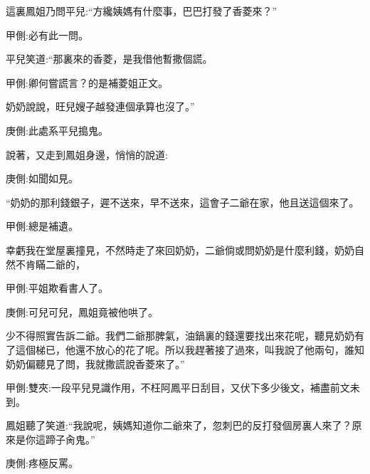 \begin{parag}
    這裏鳳姐乃問平兒:“方纔姨媽有什麼事，巴巴打發了香菱來？”\begin{note}甲側:必有此一問。\end{note}平兒笑道:“那裏來的香菱，是我借他暫撒個謊。\begin{note}甲側:卿何嘗謊言？的是補菱姐正文。\end{note}奶奶說說，旺兒嫂子越發連個承算也沒了。”\begin{note}庚側:此處系平兒搗鬼。\end{note}說著，又走到鳳姐身邊，悄悄的說道:\begin{note}庚側:如聞如見。\end{note}“奶奶的那利錢銀子，遲不送來，早不送來，這會子二爺在家，他且送這個來了。\begin{note}甲側:總是補遺。\end{note}幸虧我在堂屋裏撞見，不然時走了來回奶奶，二爺倘或問奶奶是什麼利錢，奶奶自然不肯瞞二爺的，\begin{note}甲側:平姐欺看書人了。\end{note}\begin{note}庚側:可兒可兒，鳳姐竟被他哄了。\end{note}少不得照實告訴二爺。我們二爺那脾氣，油鍋裏的錢還要找出來花呢，聽見奶奶有了這個梯已，他還不放心的花了呢。所以我趕著接了過來，叫我說了他兩句，誰知奶奶偏聽見了問，我就撒謊說香菱來了。”\begin{note}甲側:雙夾:一段平兒見識作用，不枉阿鳳平日刮目，又伏下多少後文，補盡前文未到。\end{note}鳳姐聽了笑道:“我說呢，姨媽知道你二爺來了，忽刺巴的反打發個房裏人來了？原來是你這蹄子肏鬼。”\begin{note}庚側:疼極反罵。\end{note}
\end{parag}


